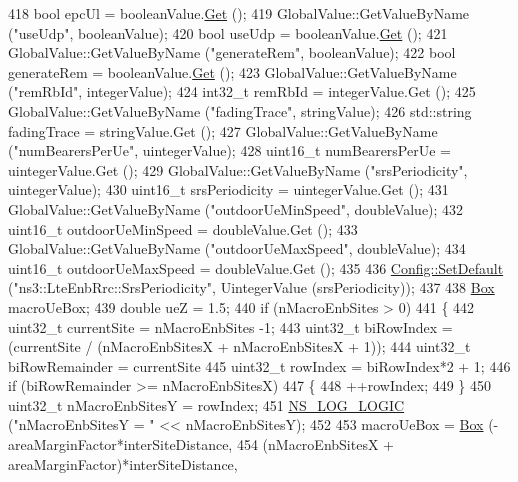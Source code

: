 \begin{DoxyCode}
418   \textcolor{keywordtype}{bool} epcUl = booleanValue.\hyperlink{classns3_1_1BooleanValue_a15d5d96abfd11676964f40859442ec12}{Get} ();
419   GlobalValue::GetValueByName (\textcolor{stringliteral}{"useUdp"}, booleanValue);
420   \textcolor{keywordtype}{bool} useUdp = booleanValue.\hyperlink{classns3_1_1BooleanValue_a15d5d96abfd11676964f40859442ec12}{Get} ();
421   GlobalValue::GetValueByName (\textcolor{stringliteral}{"generateRem"}, booleanValue);
422   \textcolor{keywordtype}{bool} generateRem = booleanValue.\hyperlink{classns3_1_1BooleanValue_a15d5d96abfd11676964f40859442ec12}{Get} ();
423   GlobalValue::GetValueByName (\textcolor{stringliteral}{"remRbId"}, integerValue);
424   int32\_t remRbId = integerValue.Get ();
425   GlobalValue::GetValueByName (\textcolor{stringliteral}{"fadingTrace"}, stringValue);
426   std::string fadingTrace = stringValue.Get ();
427   GlobalValue::GetValueByName (\textcolor{stringliteral}{"numBearersPerUe"}, uintegerValue);
428   uint16\_t numBearersPerUe = uintegerValue.Get ();
429   GlobalValue::GetValueByName (\textcolor{stringliteral}{"srsPeriodicity"}, uintegerValue);
430   uint16\_t srsPeriodicity = uintegerValue.Get ();
431   GlobalValue::GetValueByName (\textcolor{stringliteral}{"outdoorUeMinSpeed"}, doubleValue);
432   uint16\_t outdoorUeMinSpeed = doubleValue.Get ();
433   GlobalValue::GetValueByName (\textcolor{stringliteral}{"outdoorUeMaxSpeed"}, doubleValue);
434   uint16\_t outdoorUeMaxSpeed = doubleValue.Get ();
435 
436   \hyperlink{group__config_ga2e7882df849d8ba4aaad31c934c40c06}{Config::SetDefault} (\textcolor{stringliteral}{"ns3::LteEnbRrc::SrsPeriodicity"}, UintegerValue (srsPeriodicity));
437 
438   \hyperlink{classns3_1_1Box}{Box} macroUeBox;
439   \textcolor{keywordtype}{double} ueZ = 1.5;
440   \textcolor{keywordflow}{if} (nMacroEnbSites > 0)
441     \{
442       uint32\_t currentSite = nMacroEnbSites -1;
443       uint32\_t biRowIndex = (currentSite / (nMacroEnbSitesX + nMacroEnbSitesX + 1));
444       uint32\_t biRowRemainder = currentSite %
445       uint32\_t rowIndex = biRowIndex*2 + 1;
446       \textcolor{keywordflow}{if} (biRowRemainder >= nMacroEnbSitesX)
447         \{
448           ++rowIndex;
449         \}
450       uint32\_t nMacroEnbSitesY = rowIndex;
451       \hyperlink{group__logging_ga88acd260151caf2db9c0fc84997f45ce}{NS\_LOG\_LOGIC} (\textcolor{stringliteral}{"nMacroEnbSitesY = "} << nMacroEnbSitesY);
452 
453       macroUeBox = \hyperlink{classns3_1_1Box}{Box} (-areaMarginFactor*interSiteDistance, 
454                         (nMacroEnbSitesX + areaMarginFactor)*interSiteDistance, 

\end{DoxyCode}
